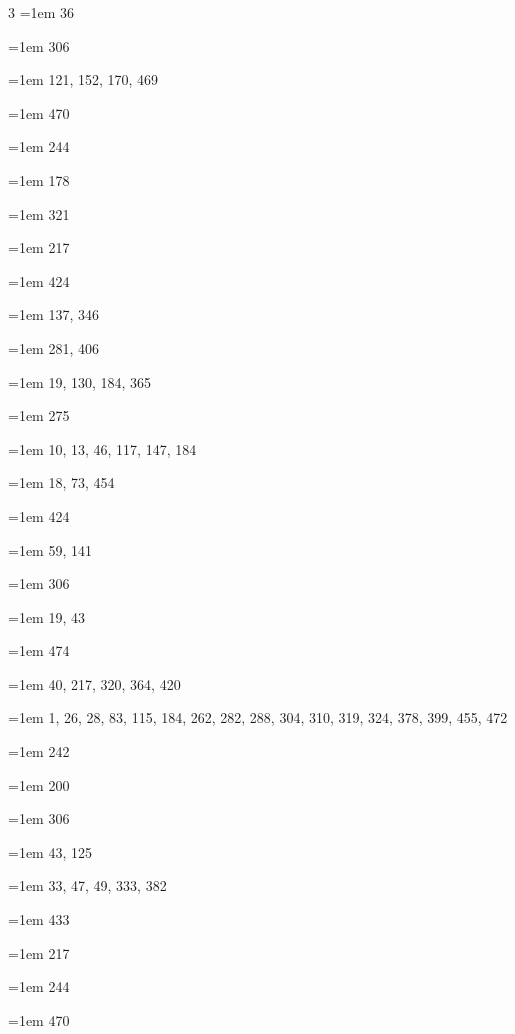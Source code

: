 \begin{multicols}{3}
\hangindent=1em  36\par
\hangindent=1em  306\par
\hangindent=1em  121, 152, 170, 469\par
\hangindent=1em  470\par
\hangindent=1em  244\par
\hangindent=1em  178\par
\hangindent=1em  321\par
\hangindent=1em  217\par
\hangindent=1em  424\par
\hangindent=1em  137, 346\par
\hangindent=1em  281, 406\par
\hangindent=1em  19, 130, 184, 365\par
\hangindent=1em  275\par
\hangindent=1em  10, 13, 46, 117, 147, 184\par
\hangindent=1em  18, 73, 454\par
\hangindent=1em  424\par
\hangindent=1em  59, 141\par
\hangindent=1em  306\par
\hangindent=1em  19, 43\par
\hangindent=1em  474\par
\hangindent=1em  40, 217, 320, 364, 420\par
\hangindent=1em  1, 26, 28, 83, 115, 184, 262, 282, 288, 304, 310, 319, 324, 378, 399, 455, 472\par
\hangindent=1em  242\par
\hangindent=1em  200\par
\hangindent=1em  306\par
\hangindent=1em  43, 125\par
\hangindent=1em  33, 47, 49, 333, 382\par
\hangindent=1em  433\par
\hangindent=1em  217\par
\hangindent=1em  244\par
\hangindent=1em  470\par

\end{multicols}
